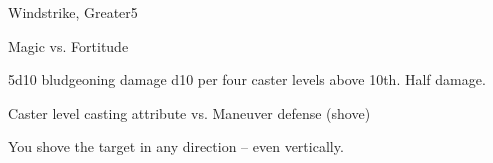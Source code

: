 \begin{spellsection}{Windstrike, Greater}{5}
\begin{spellheader}
    \begin{spelltargetinginfo}
    \end{spelltargetinginfo}
\end{spellheader}
\begin{spellcontent}
    \begin{spelleffects}
        \begin{spellattack}{Magic vs. Fortitude}
            \begin{spellmargin}
                \spellsuccess 5d10 bludgeoning damage \add d10 per four caster levels above 10th.
                \spellfailure Half damage.
            \end{spellmargin}
            \spellatk Caster level \add casting attribute  vs. Maneuver defense (shove)
            \begin{spellmargin}
                \spellsuccess You shove the target in any direction -- even vertically.
            \end{spellmargin}
        \end{spellattack}
    \end{spelleffects}
\end{spellcontent}
\begin{spellfooter}
\end{spellfooter}
\end{spellsection}


